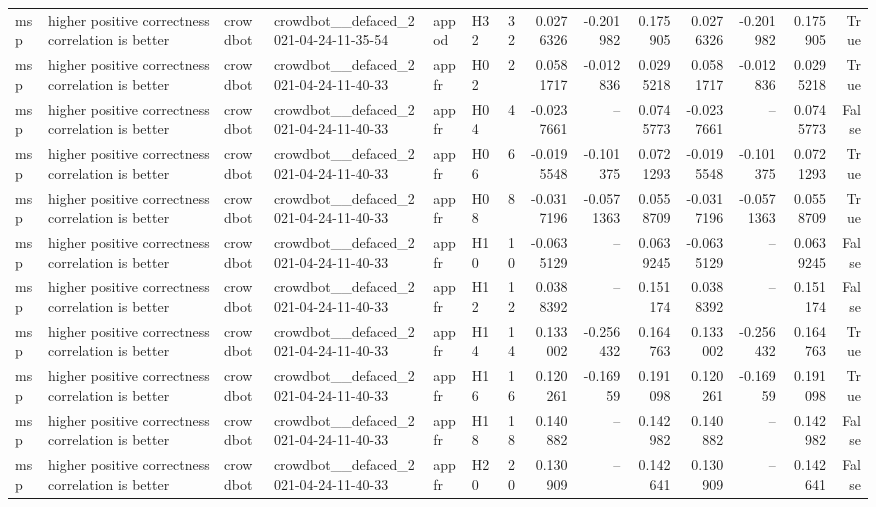 \begin{longtable}{llllllrrrrrrrr}
msp & higher positive correctness correlation is better & crowdbot & crowdbot\_\_defaced\_2021-04-24-11-35-54 & appod & H32 & 32 & 0.0276326 & -0.201982 & 0.175905 & 0.0276326 & -0.201982 & 0.175905 & True \\
msp & higher positive correctness correlation is better & crowdbot & crowdbot\_\_defaced\_2021-04-24-11-40-33 & appfr & H02 & 2 & 0.0581717 & -0.012836 & 0.0295218 & 0.0581717 & -0.012836 & 0.0295218 & True \\
msp & higher positive correctness correlation is better & crowdbot & crowdbot\_\_defaced\_2021-04-24-11-40-33 & appfr & H04 & 4 & -0.0237661 & -- & 0.0745773 & -0.0237661 & -- & 0.0745773 & False \\
msp & higher positive correctness correlation is better & crowdbot & crowdbot\_\_defaced\_2021-04-24-11-40-33 & appfr & H06 & 6 & -0.0195548 & -0.101375 & 0.0721293 & -0.0195548 & -0.101375 & 0.0721293 & True \\
msp & higher positive correctness correlation is better & crowdbot & crowdbot\_\_defaced\_2021-04-24-11-40-33 & appfr & H08 & 8 & -0.0317196 & -0.0571363 & 0.0558709 & -0.0317196 & -0.0571363 & 0.0558709 & True \\
msp & higher positive correctness correlation is better & crowdbot & crowdbot\_\_defaced\_2021-04-24-11-40-33 & appfr & H10 & 10 & -0.0635129 & -- & 0.0639245 & -0.0635129 & -- & 0.0639245 & False \\
msp & higher positive correctness correlation is better & crowdbot & crowdbot\_\_defaced\_2021-04-24-11-40-33 & appfr & H12 & 12 & 0.0388392 & -- & 0.151174 & 0.0388392 & -- & 0.151174 & False \\
msp & higher positive correctness correlation is better & crowdbot & crowdbot\_\_defaced\_2021-04-24-11-40-33 & appfr & H14 & 14 & 0.133002 & -0.256432 & 0.164763 & 0.133002 & -0.256432 & 0.164763 & True \\
msp & higher positive correctness correlation is better & crowdbot & crowdbot\_\_defaced\_2021-04-24-11-40-33 & appfr & H16 & 16 & 0.120261 & -0.16959 & 0.191098 & 0.120261 & -0.16959 & 0.191098 & True \\
msp & higher positive correctness correlation is better & crowdbot & crowdbot\_\_defaced\_2021-04-24-11-40-33 & appfr & H18 & 18 & 0.140882 & -- & 0.142982 & 0.140882 & -- & 0.142982 & False \\
msp & higher positive correctness correlation is better & crowdbot & crowdbot\_\_defaced\_2021-04-24-11-40-33 & appfr & H20 & 20 & 0.130909 & -- & 0.142641 & 0.130909 & -- & 0.142641 & False \\

\end{longtable}
